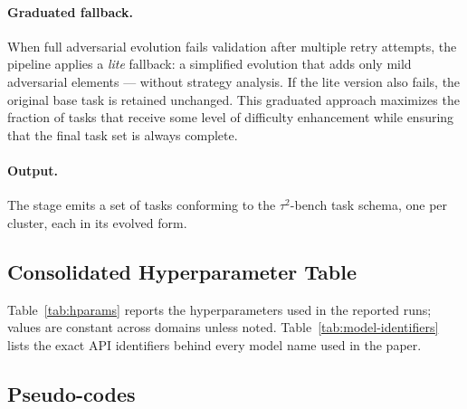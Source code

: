 \paragraph{Graduated fallback.}
\label{app:graduated-fallback}
When full adversarial evolution fails validation after multiple retry attempts, the pipeline applies a \emph{lite} fallback: a simplified evolution that adds only mild adversarial elements --- without strategy analysis. If the lite version also fails, the original base task is retained unchanged. This graduated approach maximizes the fraction of tasks that receive some level of difficulty enhancement while ensuring that the final task set is always complete.

\paragraph{Output.}
The stage emits a set of tasks conforming to the $\tau^2$-bench task schema, one per cluster, each in its evolved form.

\subsection{Consolidated Hyperparameter Table}
\label{app:impl-hparams}
Table~\ref{tab:hparams} reports the hyperparameters used in the reported runs; values are constant across domains unless noted. Table~\ref{tab:model-identifiers} lists the exact API identifiers behind every model name used in the paper.



\subsection{Pseudo-codes}
\label{app:pseudo-codes}



